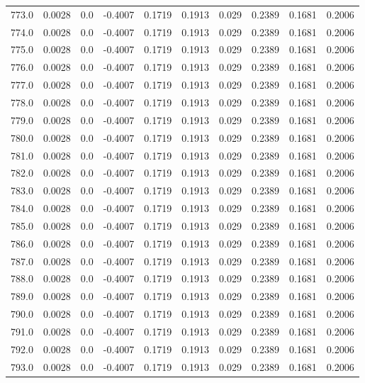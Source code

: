 \begin{longtable}{lrrrrrrrrr}
773.0 & 0.0028 & 0.0 & -0.4007 & 0.1719 & 0.1913 & 0.029 & 0.2389 & 0.1681 & 0.2006 \\
774.0 & 0.0028 & 0.0 & -0.4007 & 0.1719 & 0.1913 & 0.029 & 0.2389 & 0.1681 & 0.2006 \\
775.0 & 0.0028 & 0.0 & -0.4007 & 0.1719 & 0.1913 & 0.029 & 0.2389 & 0.1681 & 0.2006 \\
776.0 & 0.0028 & 0.0 & -0.4007 & 0.1719 & 0.1913 & 0.029 & 0.2389 & 0.1681 & 0.2006 \\
777.0 & 0.0028 & 0.0 & -0.4007 & 0.1719 & 0.1913 & 0.029 & 0.2389 & 0.1681 & 0.2006 \\
778.0 & 0.0028 & 0.0 & -0.4007 & 0.1719 & 0.1913 & 0.029 & 0.2389 & 0.1681 & 0.2006 \\
779.0 & 0.0028 & 0.0 & -0.4007 & 0.1719 & 0.1913 & 0.029 & 0.2389 & 0.1681 & 0.2006 \\
780.0 & 0.0028 & 0.0 & -0.4007 & 0.1719 & 0.1913 & 0.029 & 0.2389 & 0.1681 & 0.2006 \\
781.0 & 0.0028 & 0.0 & -0.4007 & 0.1719 & 0.1913 & 0.029 & 0.2389 & 0.1681 & 0.2006 \\
782.0 & 0.0028 & 0.0 & -0.4007 & 0.1719 & 0.1913 & 0.029 & 0.2389 & 0.1681 & 0.2006 \\
783.0 & 0.0028 & 0.0 & -0.4007 & 0.1719 & 0.1913 & 0.029 & 0.2389 & 0.1681 & 0.2006 \\
784.0 & 0.0028 & 0.0 & -0.4007 & 0.1719 & 0.1913 & 0.029 & 0.2389 & 0.1681 & 0.2006 \\
785.0 & 0.0028 & 0.0 & -0.4007 & 0.1719 & 0.1913 & 0.029 & 0.2389 & 0.1681 & 0.2006 \\
786.0 & 0.0028 & 0.0 & -0.4007 & 0.1719 & 0.1913 & 0.029 & 0.2389 & 0.1681 & 0.2006 \\
787.0 & 0.0028 & 0.0 & -0.4007 & 0.1719 & 0.1913 & 0.029 & 0.2389 & 0.1681 & 0.2006 \\
788.0 & 0.0028 & 0.0 & -0.4007 & 0.1719 & 0.1913 & 0.029 & 0.2389 & 0.1681 & 0.2006 \\
789.0 & 0.0028 & 0.0 & -0.4007 & 0.1719 & 0.1913 & 0.029 & 0.2389 & 0.1681 & 0.2006 \\
790.0 & 0.0028 & 0.0 & -0.4007 & 0.1719 & 0.1913 & 0.029 & 0.2389 & 0.1681 & 0.2006 \\
791.0 & 0.0028 & 0.0 & -0.4007 & 0.1719 & 0.1913 & 0.029 & 0.2389 & 0.1681 & 0.2006 \\
792.0 & 0.0028 & 0.0 & -0.4007 & 0.1719 & 0.1913 & 0.029 & 0.2389 & 0.1681 & 0.2006 \\
793.0 & 0.0028 & 0.0 & -0.4007 & 0.1719 & 0.1913 & 0.029 & 0.2389 & 0.1681 & 0.2006 \\

\end{longtable}
